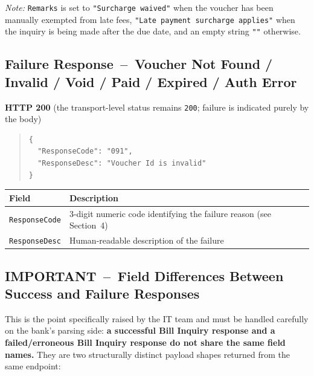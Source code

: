 \documentclass[11pt]{article}
\begin{document}
\noindent\textit{Note:} \texttt{Remarks} is set to \texttt{"Surcharge waived"} when the voucher
has been manually exempted from late fees, \texttt{"Late payment surcharge applies"} when the
inquiry is being made after the due date, and an empty string \texttt{""} otherwise.

\subsection{Failure Response \,--\, Voucher Not Found / Invalid / Void / Paid / Expired / Auth Error}
\textbf{HTTP 200} (the transport-level status remains \texttt{200}; failure is indicated purely
by the body)

\begin{quote}
\begin{verbatim}
{
  "ResponseCode": "091",
  "ResponseDesc": "Voucher Id is invalid"
}
\end{verbatim}
\end{quote}

\begin{center}
\begin{tabular}{@{}ll@{}}
\toprule
\textbf{Field} & \textbf{Description} \\
\midrule
\texttt{ResponseCode} & 3-digit numeric code identifying the failure reason (see Section~4) \\
\texttt{ResponseDesc} & Human-readable description of the failure \\
\bottomrule
\end{tabular}
\end{center}

\subsection{IMPORTANT \,--\, Field Differences Between Success and Failure Responses}
\label{sec:field-diff}
This is the point specifically raised by the IT team and must be handled carefully on the
bank's parsing side: \textbf{a successful Bill Inquiry response and a failed/erroneous Bill
Inquiry response do not share the same field names.} They are two structurally distinct
payload shapes returned from the same endpoint:
\end{document}
